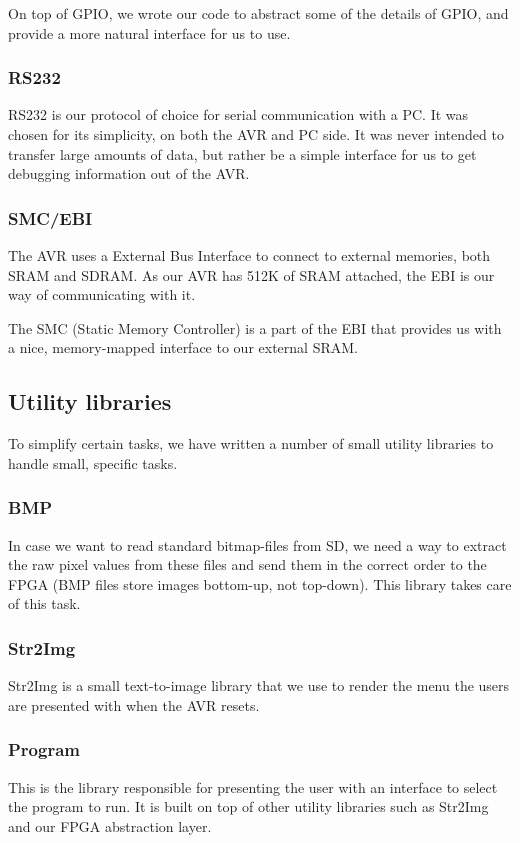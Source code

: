 On top of GPIO, we wrote our code to abstract some of the details of
GPIO, and provide a more natural interface for us to use.

\subsubsection{RS232}
RS232 is our protocol of choice for serial communication with a PC. It
was chosen for its simplicity, on both the AVR and PC side. It was never
intended to transfer large amounts of data, but rather be a simple
interface for us to get debugging information out of the AVR.

\subsubsection{SMC/EBI}
The AVR uses a External Bus Interface to connect to external memories,
both SRAM and SDRAM. As our AVR has 512K of SRAM attached, the EBI is
our way of communicating with it.

The SMC (Static Memory Controller) is a part of the EBI that provides us
with a nice, memory-mapped interface to our external SRAM.

\subsection{Utility libraries}
To simplify certain tasks, we have written a number of small utility
libraries to handle small, specific tasks.

\subsubsection{BMP}
In case we want to read standard bitmap-files from SD, we need a way to
extract the raw pixel values from these files and send them in the
correct order to the FPGA (BMP files store images bottom-up, not
top-down). This library takes care of this task.

\subsubsection{Str2Img}
Str2Img is a small text-to-image library that we use to render the menu
the users are presented with when the AVR resets.

\subsubsection{Program}
This is the library responsible for presenting the user with an
interface to select the program to run. It is built on top of other
utility libraries such as Str2Img and our FPGA abstraction layer.

